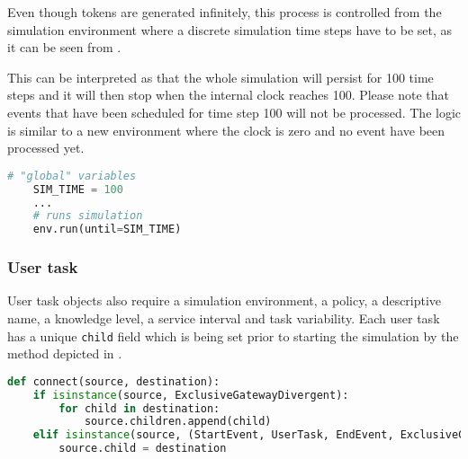 \documentclass{seal_thesis}
\begin{document}
Even though tokens are generated infinitely, this process is controlled from the simulation environment where a discrete simulation time steps have to be set, as it can be seen from .

This can be interpreted as that the whole simulation will persist for 100 time steps and it will then stop when the internal clock reaches 100. Please note that events that have been scheduled for time step 100 will not be processed. The logic is similar to a new environment where the clock is zero and no event have been processed yet.

\begin{lstlisting}[caption=Starting the simulation with discrete time steps,label=lst:simulation_steps,language=Python]
    # "global" variables
    SIM_TIME = 100
    ...
    # runs simulation
    env.run(until=SIM_TIME)
\end{lstlisting}

\subsubsection{User task}

User task objects also require a simulation environment, a policy, a descriptive name, a knowledge level, a service interval and task variability. Each user task has a unique \texttt{child} field which is being set prior to starting the simulation by the method depicted in .

\begin{lstlisting}[caption=Method used to connect workflow elements,label=lst:connect,language=Python]
    def connect(source, destination):
    if isinstance(source, ExclusiveGatewayDivergent):
        for child in destination:
            source.children.append(child)
    elif isinstance(source, (StartEvent, UserTask, EndEvent, ExclusiveGatewayConvergent)):
        source.child = destination
\end{lstlisting}
\end{document}
